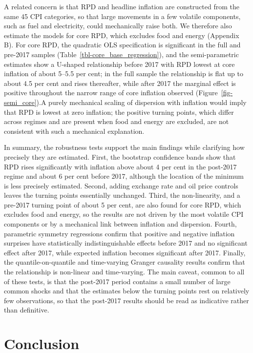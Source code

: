 \documentclass[
  letterpaper,
  DIV=11,
  numbers=noendperiod]{scrartcl}
\begin{document}
A related concern is that RPD and headline inflation are constructed
from the same 45 CPI categories, so that large movements in a few
volatile components, such as fuel and electricity, could mechanically
raise both. We therefore also estimate the models for core RPD, which
excludes food and energy (Appendix B). For core RPD, the quadratic OLS
specification is significant in the full and pre-2017 samples
(Table~\ref{tbl-core_base_regression}), and the semi-parametric
estimates show a U-shaped relationship before 2017 with RPD lowest at
core inflation of about 5--5.5 per cent; in the full sample the
relationship is flat up to about 4.5 per cent and rises thereafter,
while after 2017 the marginal effect is positive throughout the narrow
range of core inflation observed (Figure~\ref{fig-semi_core}).A purely
mechanical scaling of dispersion with inflation would imply that RPD is
lowest at zero inflation; the positive turning points, which differ
across regimes and are present when food and energy are excluded, are
not consistent with such a mechanical explanation.

In summary, the robustness tests support the main findings while
clarifying how precisely they are estimated. First, the bootstrap
confidence bands show that RPD rises significantly with inflation above
about 4 per cent in the post-2017 regime and about 6 per cent before
2017, although the location of the minimum is less precisely estimated.
Second, adding exchange rate and oil price controls leaves the turning
points essentially unchanged. Third, the non-linearity, and a pre-2017
turning point of about 5 per cent, are also found for core RPD, which
excludes food and energy, so the results are not driven by the most
volatile CPI components or by a mechanical link between inflation and
dispersion. Fourth, parametric symmetry regressions confirm that
positive and negative inflation surprises have statistically
indistinguishable effects before 2017 and no significant effect after
2017, while expected inflation becomes significant after 2017. Finally,
the quantile-on-quantile and time-varying Granger causality results
confirm that the relationship is non-linear and time-varying. The main
caveat, common to all of these tests, is that the post-2017 period
contains a small number of large common shocks and that the estimates
below the turning points rest on relatively few observations, so that
the post-2017 results should be read as indicative rather than
definitive.

\section{Conclusion}\label{conclusion}
\end{document}
